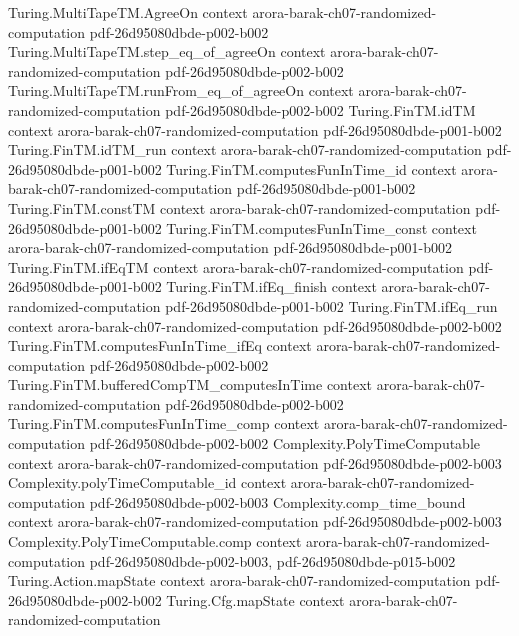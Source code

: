 \begin{theorem}
\proofstep
  {Turing.MultiTapeTM.AgreeOn}
  {context}
  {arora-barak-ch07-randomized-computation}
  {pdf-26d95080dbde-p002-b002}
\proofstep
  {Turing.MultiTapeTM.step_eq_of_agreeOn}
  {context}
  {arora-barak-ch07-randomized-computation}
  {pdf-26d95080dbde-p002-b002}
\proofstep
  {Turing.MultiTapeTM.runFrom_eq_of_agreeOn}
  {context}
  {arora-barak-ch07-randomized-computation}
  {pdf-26d95080dbde-p002-b002}
\proofstep
  {Turing.FinTM.idTM}
  {context}
  {arora-barak-ch07-randomized-computation}
  {pdf-26d95080dbde-p001-b002}
\proofstep
  {Turing.FinTM.idTM_run}
  {context}
  {arora-barak-ch07-randomized-computation}
  {pdf-26d95080dbde-p001-b002}
\proofstep
  {Turing.FinTM.computesFunInTime_id}
  {context}
  {arora-barak-ch07-randomized-computation}
  {pdf-26d95080dbde-p001-b002}
\proofstep
  {Turing.FinTM.constTM}
  {context}
  {arora-barak-ch07-randomized-computation}
  {pdf-26d95080dbde-p001-b002}
\proofstep
  {Turing.FinTM.computesFunInTime_const}
  {context}
  {arora-barak-ch07-randomized-computation}
  {pdf-26d95080dbde-p001-b002}
\proofstep
  {Turing.FinTM.ifEqTM}
  {context}
  {arora-barak-ch07-randomized-computation}
  {pdf-26d95080dbde-p001-b002}
\proofstep
  {Turing.FinTM.ifEq_finish}
  {context}
  {arora-barak-ch07-randomized-computation}
  {pdf-26d95080dbde-p001-b002}
\proofstep
  {Turing.FinTM.ifEq_run}
  {context}
  {arora-barak-ch07-randomized-computation}
  {pdf-26d95080dbde-p002-b002}
\proofstep
  {Turing.FinTM.computesFunInTime_ifEq}
  {context}
  {arora-barak-ch07-randomized-computation}
  {pdf-26d95080dbde-p002-b002}
\proofstep
  {Turing.FinTM.bufferedCompTM_computesInTime}
  {context}
  {arora-barak-ch07-randomized-computation}
  {pdf-26d95080dbde-p002-b002}
\proofstep
  {Turing.FinTM.computesFunInTime_comp}
  {context}
  {arora-barak-ch07-randomized-computation}
  {pdf-26d95080dbde-p002-b002}
\proofstep
  {Complexity.PolyTimeComputable}
  {context}
  {arora-barak-ch07-randomized-computation}
  {pdf-26d95080dbde-p002-b003}
\proofstep
  {Complexity.polyTimeComputable_id}
  {context}
  {arora-barak-ch07-randomized-computation}
  {pdf-26d95080dbde-p002-b003}
\proofstep
  {Complexity.comp_time_bound}
  {context}
  {arora-barak-ch07-randomized-computation}
  {pdf-26d95080dbde-p002-b003}
\proofstep
  {Complexity.PolyTimeComputable.comp}
  {context}
  {arora-barak-ch07-randomized-computation}
  {pdf-26d95080dbde-p002-b003,
    pdf-26d95080dbde-p015-b002}
\proofstep
  {Turing.Action.mapState}
  {context}
  {arora-barak-ch07-randomized-computation}
  {pdf-26d95080dbde-p002-b002}
\proofstep
  {Turing.Cfg.mapState}
  {context}
  {arora-barak-ch07-randomized-computation}

\end{theorem}
